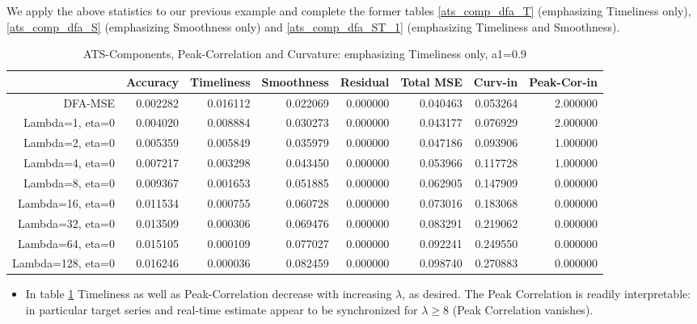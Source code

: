 \documentclass[a4paper]{book}
\begin{document}
We apply the above statistics to our previous example and complete the former tables \ref{ats_comp_dfa_T} (emphasizing Timeliness only), \ref{ats_comp_dfa_S} (emphasizing Smoothness only) and \ref{ats_comp_dfa_ST_1} (emphasizing Timeliness and Smoothness). 
\begin{table}[ht]
\centering
\begin{tabular}{rrrrrrrr}
  \hline
 & Accuracy & Timeliness & Smoothness & Residual & Total MSE & Curv-in & Peak-Cor-in \\ 
  \hline
DFA-MSE & 0.002282 & 0.016112 & 0.022069 & 0.000000 & 0.040463 & 0.053264 & 2.000000 \\ 
  Lambda=1, eta=0 & 0.004020 & 0.008884 & 0.030273 & 0.000000 & 0.043177 & 0.076929 & 2.000000 \\ 
  Lambda=2, eta=0 & 0.005359 & 0.005849 & 0.035979 & 0.000000 & 0.047186 & 0.093906 & 1.000000 \\ 
  Lambda=4, eta=0 & 0.007217 & 0.003298 & 0.043450 & 0.000000 & 0.053966 & 0.117728 & 1.000000 \\ 
  Lambda=8, eta=0 & 0.009367 & 0.001653 & 0.051885 & 0.000000 & 0.062905 & 0.147909 & 0.000000 \\ 
  Lambda=16, eta=0 & 0.011534 & 0.000755 & 0.060728 & 0.000000 & 0.073016 & 0.183068 & 0.000000 \\ 
  Lambda=32, eta=0 & 0.013509 & 0.000306 & 0.069476 & 0.000000 & 0.083291 & 0.219062 & 0.000000 \\ 
  Lambda=64, eta=0 & 0.015105 & 0.000109 & 0.077027 & 0.000000 & 0.092241 & 0.249550 & 0.000000 \\ 
  Lambda=128, eta=0 & 0.016246 & 0.000036 & 0.082459 & 0.000000 & 0.098740 & 0.270883 & 0.000000 \\ 
   \hline
\end{tabular}
\caption{ATS-Components, Peak-Correlation and Curvature: emphasizing Timeliness only, a1=0.9} 
\label{ats_comp_dfa_T_1_pc}
\end{table}\begin{itemize}
\item In table \ref{ats_comp_dfa_T_1_pc} Timeliness as well as Peak-Correlation decrease with increasing $\lambda$, as desired. The Peak Correlation is readily interpretable: in particular target series and real-time estimate appear to be  synchronized for $\lambda\geq 8$ (Peak Correlation vanishes).
\begin{table}[ht]

\end{table}
\end{itemize}
\end{document}
